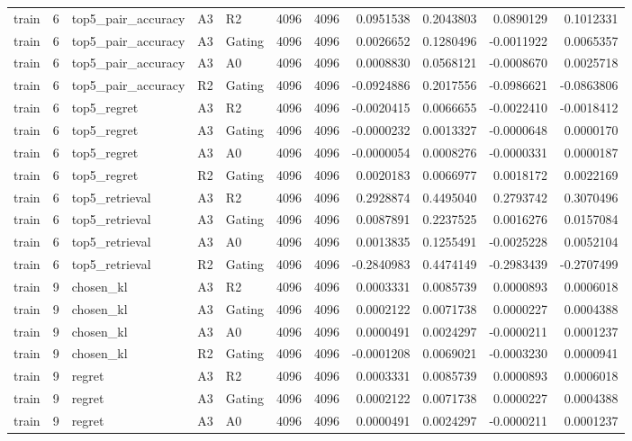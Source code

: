\begin{tabular}{lrlllrrrrrr}
train & 6 & top5_pair_accuracy & A3 & R2 & 4096 & 4096 & 0.0951538 & 0.2043803 & 0.0890129 & 0.1012331 \\
train & 6 & top5_pair_accuracy & A3 & Gating & 4096 & 4096 & 0.0026652 & 0.1280496 & -0.0011922 & 0.0065357 \\
train & 6 & top5_pair_accuracy & A3 & A0 & 4096 & 4096 & 0.0008830 & 0.0568121 & -0.0008670 & 0.0025718 \\
train & 6 & top5_pair_accuracy & R2 & Gating & 4096 & 4096 & -0.0924886 & 0.2017556 & -0.0986621 & -0.0863806 \\
train & 6 & top5_regret & A3 & R2 & 4096 & 4096 & -0.0020415 & 0.0066655 & -0.0022410 & -0.0018412 \\
train & 6 & top5_regret & A3 & Gating & 4096 & 4096 & -0.0000232 & 0.0013327 & -0.0000648 & 0.0000170 \\
train & 6 & top5_regret & A3 & A0 & 4096 & 4096 & -0.0000054 & 0.0008276 & -0.0000331 & 0.0000187 \\
train & 6 & top5_regret & R2 & Gating & 4096 & 4096 & 0.0020183 & 0.0066977 & 0.0018172 & 0.0022169 \\
train & 6 & top5_retrieval & A3 & R2 & 4096 & 4096 & 0.2928874 & 0.4495040 & 0.2793742 & 0.3070496 \\
train & 6 & top5_retrieval & A3 & Gating & 4096 & 4096 & 0.0087891 & 0.2237525 & 0.0016276 & 0.0157084 \\
train & 6 & top5_retrieval & A3 & A0 & 4096 & 4096 & 0.0013835 & 0.1255491 & -0.0025228 & 0.0052104 \\
train & 6 & top5_retrieval & R2 & Gating & 4096 & 4096 & -0.2840983 & 0.4474149 & -0.2983439 & -0.2707499 \\
train & 9 & chosen_kl & A3 & R2 & 4096 & 4096 & 0.0003331 & 0.0085739 & 0.0000893 & 0.0006018 \\
train & 9 & chosen_kl & A3 & Gating & 4096 & 4096 & 0.0002122 & 0.0071738 & 0.0000227 & 0.0004388 \\
train & 9 & chosen_kl & A3 & A0 & 4096 & 4096 & 0.0000491 & 0.0024297 & -0.0000211 & 0.0001237 \\
train & 9 & chosen_kl & R2 & Gating & 4096 & 4096 & -0.0001208 & 0.0069021 & -0.0003230 & 0.0000941 \\
train & 9 & regret & A3 & R2 & 4096 & 4096 & 0.0003331 & 0.0085739 & 0.0000893 & 0.0006018 \\
train & 9 & regret & A3 & Gating & 4096 & 4096 & 0.0002122 & 0.0071738 & 0.0000227 & 0.0004388 \\
train & 9 & regret & A3 & A0 & 4096 & 4096 & 0.0000491 & 0.0024297 & -0.0000211 & 0.0001237 \\

\end{tabular}
